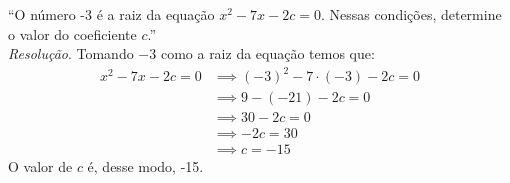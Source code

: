 \enquote{O número -3 é a raiz da equação $x^2 - 7x - 2c = 0$. Nessas condições, determine o valor do coeficiente $c$.} \\
\emph{Resolução}. Tomando $-3$ como a raiz da equação temos que:
\begin{align*}
    x^2 - 7x - 2c = 0 & \implies (-3)^2 - 7 \cdot (-3) - 2c = 0 \\ & \implies 
    9 - (-21) - 2c = 0 \\ & \implies 30 - 2c = 0 \\ & \implies
    -2c = 30 \\ & \implies
    c = -15
\end{align*}    
O valor de $c$ é, desse modo, -15.